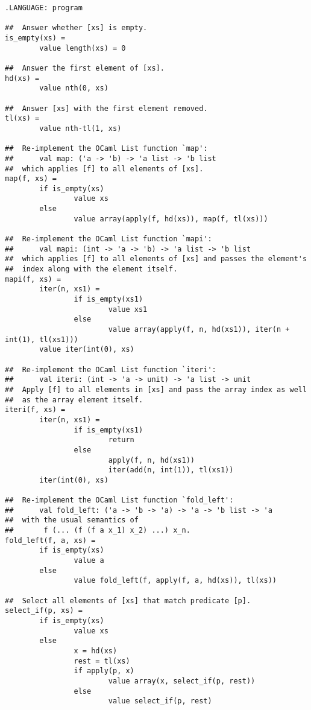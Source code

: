 \begin{verbatim}
.LANGUAGE: program

##  Answer whether [xs] is empty.
is_empty(xs) =
        value length(xs) = 0

##  Answer the first element of [xs].
hd(xs) =
        value nth(0, xs)

##  Answer [xs] with the first element removed.
tl(xs) =
        value nth-tl(1, xs)

##  Re-implement the OCaml List function `map':
##      val map: ('a -> 'b) -> 'a list -> 'b list
##  which applies [f] to all elements of [xs].
map(f, xs) =
        if is_empty(xs)
                value xs
        else
                value array(apply(f, hd(xs)), map(f, tl(xs)))

##  Re-implement the OCaml List function `mapi':
##      val mapi: (int -> 'a -> 'b) -> 'a list -> 'b list
##  which applies [f] to all elements of [xs] and passes the element's
##  index along with the element itself.
mapi(f, xs) =
        iter(n, xs1) =
                if is_empty(xs1)
                        value xs1
                else
                        value array(apply(f, n, hd(xs1)), iter(n + int(1), tl(xs1)))
        value iter(int(0), xs)

##  Re-implement the OCaml List function `iteri':
##      val iteri: (int -> 'a -> unit) -> 'a list -> unit
##  Apply [f] to all elements in [xs] and pass the array index as well
##  as the array element itself.
iteri(f, xs) =
        iter(n, xs1) =
                if is_empty(xs1)
                        return
                else
                        apply(f, n, hd(xs1))
                        iter(add(n, int(1)), tl(xs1))
        iter(int(0), xs)

##  Re-implement the OCaml List function `fold_left':
##      val fold_left: ('a -> 'b -> 'a) -> 'a -> 'b list -> 'a
##  with the usual semantics of
##       f (... (f (f a x_1) x_2) ...) x_n.
fold_left(f, a, xs) =
        if is_empty(xs)
                value a
        else
                value fold_left(f, apply(f, a, hd(xs)), tl(xs))

##  Select all elements of [xs] that match predicate [p].
select_if(p, xs) =
        if is_empty(xs)
                value xs
        else
                x = hd(xs)
                rest = tl(xs)
                if apply(p, x)
                        value array(x, select_if(p, rest))
                else
                        value select_if(p, rest)
\end{verbatim}

